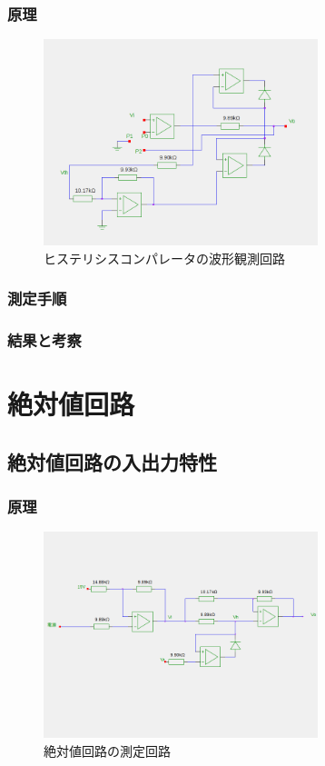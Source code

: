 \documentclass[11pt,a4j]{jsarticle}
\begin{document}
   \subsubsection{原理}
    
    \begin{figure}[htbp]
  \centering
  \includegraphics[width=8cm,clip]{histeri_wave.png}
  \caption{ヒステリシスコンパレータの波形観測回路}
  \label{fig:histeri_wave}
 \end{figure}%
    
   \subsubsection{測定手順}
    
    
   \subsubsection{結果と考察}
    
    
 \section{絶対値回路}
  \subsection{絶対値回路の入出力特性}
   \subsubsection{原理}
    
    \begin{figure}[htbp]
  \centering
  \includegraphics[width=8cm,clip]{abs_tokusei.png}
  \caption{絶対値回路の測定回路}
  \label{fig:abs_tokusei}
 \end{figure}%
    
\end{document}
